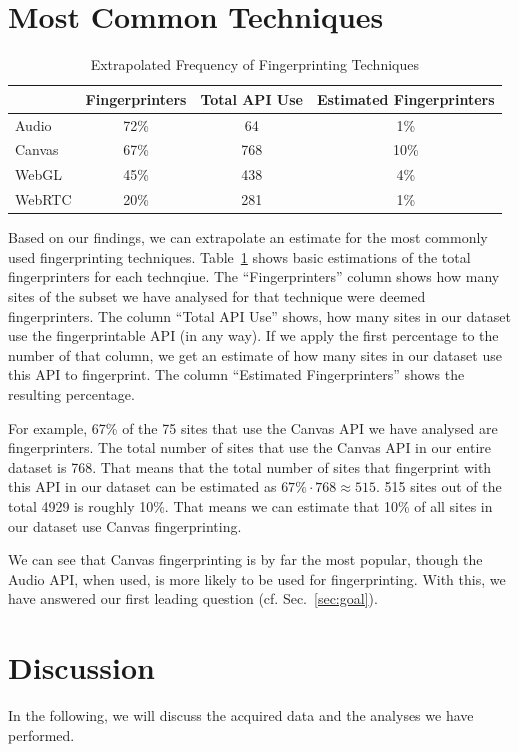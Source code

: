 \documentclass[
    fontsize=12pt,
    headings=small,
    parskip=half,
    bibliography=totoc,
    numbers=noenddot,
    open=any
    ]{scrreprt}
\begin{document}
\section{Most Common Techniques}
\label{sec:most_common_techniques}
\begin{table}
\centering
\caption{Extrapolated Frequency of Fingerprinting Techniques}
\begin{tabular}{l c c c}
    \toprule
    & Fingerprinters & Total API Use & Estimated Fingerprinters \\
    \midrule
    Audio & 72\% & 64 & 1\% \\
    Canvas & 67\% & 768 & 10\% \\
    WebGL & 45\% & 438 & 4\% \\
    WebRTC & 20\% & 281 & 1\% \\
    \bottomrule
\end{tabular}
\label{table:technique_frequency}
\end{table}

Based on our findings, we can extrapolate an estimate for the most commonly used fingerprinting
techniques.
Table~\ref{table:technique_frequency} shows basic estimations of the total fingerprinters
for each technqiue. The ``Fingerprinters'' column shows how many sites of the subset
we have analysed for that technique were deemed fingerprinters. The column ``Total API Use''
shows, how many sites in our dataset use the fingerprintable API (in any way).
If we apply the first percentage to the number of that column, we get an estimate
of how many sites in our dataset use this API to fingerprint. The column ``Estimated Fingerprinters''
shows the resulting percentage.

For example, 67\% of the 75 sites that use the Canvas API we have analysed are fingerprinters.
The total number of sites that use the Canvas API in our entire dataset is 768.
That means that the total number of sites that fingerprint with this API in our dataset
can be estimated as $ 67\% \cdot 768 \approx 515  $. 515 sites out of the total 4929
is roughly 10\%. That means we can estimate that 10\% of all sites in our dataset use Canvas
fingerprinting.

We can see that Canvas fingerprinting is by far the most popular, though the Audio API, when used,
is more likely to be used for fingerprinting.
With this, we have answered our first leading question (cf. Sec.~\ref{sec:goal}).


\section{Discussion}
\label{sec:data_discussion}
In the following, we will discuss the acquired data and the analyses we have performed.
\end{document}
